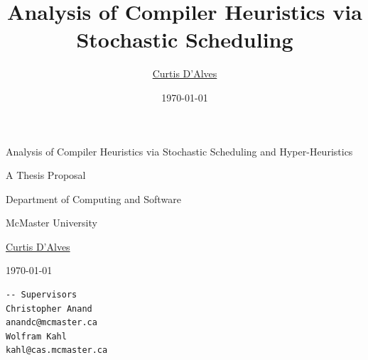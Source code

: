 \documentclass[12pt]{report}
\author{\href{mailto:dalvescb@mcmaster.ca}{Curtis D'Alves}}
\date{\today}
\title{Analysis of Compiler Heuristics via Stochastic Scheduling}
\def\mytitle{??? Program Code ???}
\begin{document}
\def\labelitemi{$\diamond$}
\def\labelitemii{$\circ$}
\def\labelitemiii{$\star$}

%

\begin{center}


\thispagestyle{empty}

{\color{white}{.}}

\vspace{5em}

{\Huge Analysis of Compiler Heuristics via Stochastic Scheduling and Hyper-Heuristics}

\vspace{1em}

{\Large A Thesis Proposal}

\vspace{2em}

Department of Computing and Software

McMaster University

\vspace{2em}
\href{mailto:curtis.dalves@gmail.com}{Curtis D'Alves}

\vspace{2em}
\today

\vfill

\def\mytitle{{\sc Thesis Proposal \hspace{12em} \color{grey}{.} }}
\begin{verbatim}
-- Supervisors
Christopher Anand                                    anandc@mcmaster.ca
Wolfram Kahl                                         kahl@cas.mcmaster.ca
\end{verbatim}
\end{center}
\end{document}

